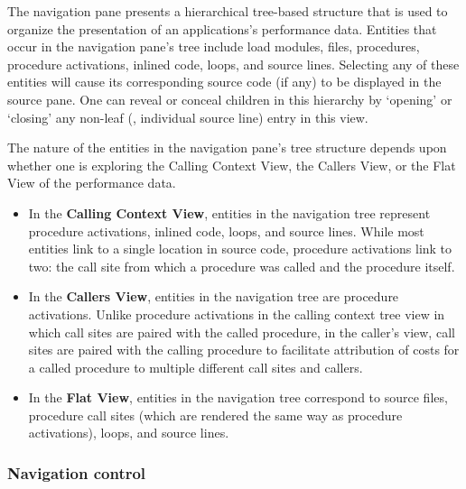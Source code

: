 The navigation pane presents a hierarchical tree-based structure that is used to organize the presentation of an applications's performance data.
Entities that occur in the navigation pane's tree include load modules, files, procedures, procedure activations, inlined code, loops, and source lines.
Selecting any of these entities will cause its corresponding source code (if any) to be displayed in the source pane.
One can reveal or conceal children in this hierarchy by `opening' or `closing' any non-leaf (\ie{}, individual source line) entry in this view.

The nature of the entities in the navigation pane's tree structure depends upon whether one is exploring the Calling Context View, the Callers View, or the Flat View of the performance data.
\begin{itemize}
\item In the \textbf{Calling Context View}, entities in the navigation tree represent procedure activations, inlined code, loops, and source lines.
  While most entities link to a single location in source code, procedure activations link to two: the call site from which a procedure was called and the procedure itself.

\item In the \textbf{Callers View}, entities in the navigation tree are procedure activations.
  Unlike procedure activations in the calling context tree view in which call sites are paired with the called procedure, in the caller's view, call sites are paired with the calling procedure to facilitate attribution of costs for a called procedure to multiple different call sites and callers.

\item In the \textbf{Flat View}, entities in the navigation tree correspond to source files, procedure call sites (which are rendered the same way as procedure activations), loops, and source lines.
\end{itemize}

\subsubsection{Navigation control}

